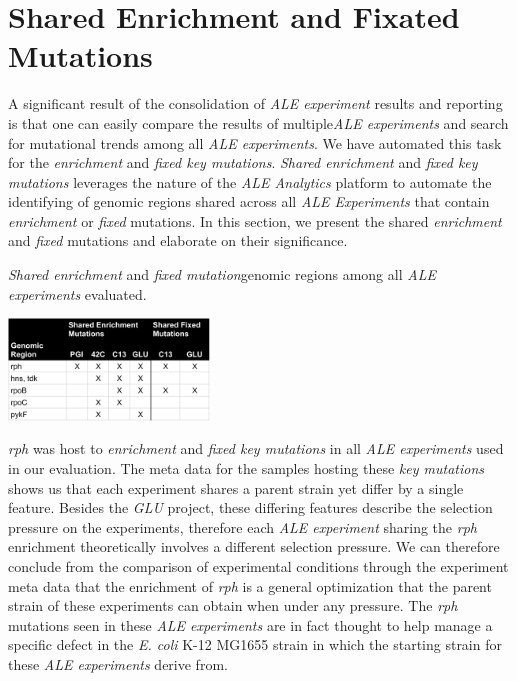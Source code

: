 \documentclass[12pt,final,masters,chapterheads]{ucsd}  %
\begin{document}
\section{Shared Enrichment and Fixated Mutations}
A significant result of the consolidation of \textit{ALE experiment} results and reporting is that one can easily compare the results of multiple\textit{ALE experiments} and search for mutational trends among all \textit{ALE experiments}. We have automated this task for the \textit{enrichment} and \textit{fixed key mutations}. \textit{Shared enrichment} and \textit{fixed key mutations} leverages the nature of the \textit{ALE Analytics} platform to automate the identifying of genomic regions shared across all \textit{ALE Experiments} that contain \textit{enrichment} or \textit{fixed} mutations. In this section, we present the shared \textit{enrichment} and \textit{fixed} mutations and elaborate on their significance.%
\begin{table}[H]
  \caption{\textit{Shared enrichment} and \textit{fixed mutation}genomic regions among all \textit{ALE experiments} evaluated.}
  \centering
  \includegraphics[width=0.4\textwidth]{shared_enrichment_fixed_genomic_regions.png}
\end{table}
\textit{rph} was host to \textit{enrichment} and \textit{fixed key mutations} in all \textit{ALE experiments} used in our evaluation. The meta data for the samples hosting these \textit{key mutations} shows us that each experiment shares a parent strain yet differ by a single feature. Besides the \textit{GLU} project, these differing features describe the selection pressure on the experiments, therefore each \textit{ALE experiment} sharing the \textit{rph} enrichment theoretically involves a different selection pressure. We can therefore conclude from the comparison of experimental conditions through the experiment meta data that the enrichment of \textit{rph} is a general optimization that the parent strain of these experiments can obtain when under any pressure. The \textit{rph} mutations seen in these \textit{ALE experiments} are in fact thought to help manage a specific defect in the \textit{E. coli} K-12 MG1655 strain in which the starting strain for these \textit{ALE experiments} derive from\cite{Conrad2009}.
\end{document}
